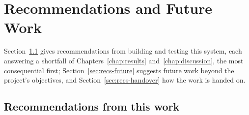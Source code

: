 \chapter{Recommendations and Future Work}
\label{chap:recs}

Section~\ref{sec:recs-next} gives recommendations from building and testing this system, each answering a shortfall of Chapters~\ref{chap:results} and~\ref{chap:discussion}, the most consequential first; Section~\ref{sec:recs-future} suggests future work beyond the project's objectives, and Section~\ref{sec:recs-handover} how the work is handed on.

\section{Recommendations from this work}
\label{sec:recs-next}

